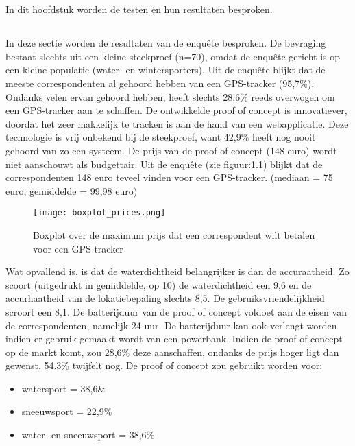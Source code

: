 \chapter{}
\label{ch:resultaten}
In dit hoofdstuk worden de testen en hun resultaten besproken.
\section{}
In deze sectie worden de resultaten van de enquête besproken.
\newline
De bevraging bestaat slechts uit een kleine steekproef (n=70), omdat de enquête gericht is op een kleine populatie (water- en wintersporters). Uit de enquête blijkt dat de meeste correspondenten al gehoord hebben van een GPS-tracker (95,7\%). Ondanks velen ervan gehoord hebben, heeft slechts 28,6\% reeds overwogen om een GPS-tracker aan te schaffen. De ontwikkelde proof of concept is innovatiever, doordat het zeer makkelijk te tracken is aan de hand van een webapplicatie. Deze technologie is vrij onbekend bij de steekproef, want 42,9\% heeft nog nooit gehoord van zo een systeem. 
\newline
De prijs van de proof of concept (148 euro) wordt niet aanschouwt als budgettair. Uit de enquête (zie figuur:\ref{graph:price}) blijkt dat de correspondenten 148 euro teveel vinden voor een GPS-tracker. (mediaan = 75 euro, gemiddelde = 99,98 euro) 
\begin{figure}
	\texttt{[image: boxplot\_prices.png]}
	\caption{Boxplot over de maximum prijs dat een correspondent wilt betalen voor een GPS-tracker}
	\label{graph:price}
\end{figure}
\newline
Wat opvallend is, is dat de waterdichtheid belangrijker is dan de accuraatheid. Zo scoort (uitgedrukt in gemiddelde, op 10) de waterdichtheid een 9,6 en de accurhaatheid van de lokatiebepaling slechts 8,5. De gebruiksvriendelijkheid scroort een 8,1. 
\newline
De batterijduur van de proof of concept voldoet aan de eisen van de correspondenten, namelijk 24 uur. De batterijduur kan ook verlengt worden indien er gebruik gemaakt wordt van een powerbank.
\newline
Indien de proof of concept op de markt komt, zou 28,6\% deze aanschaffen, ondanks de prijs hoger ligt dan gewenst. 54.3\% twijfelt nog. 
\newline
De proof of concept zou gebruikt worden voor:
\begin{itemize}
	\item watersport = 38,6\&
	\item sneeuwsport = 22,9\%
	\item water- en sneeuwsport = 38,6\%
\end{itemize}
\pagebreak
